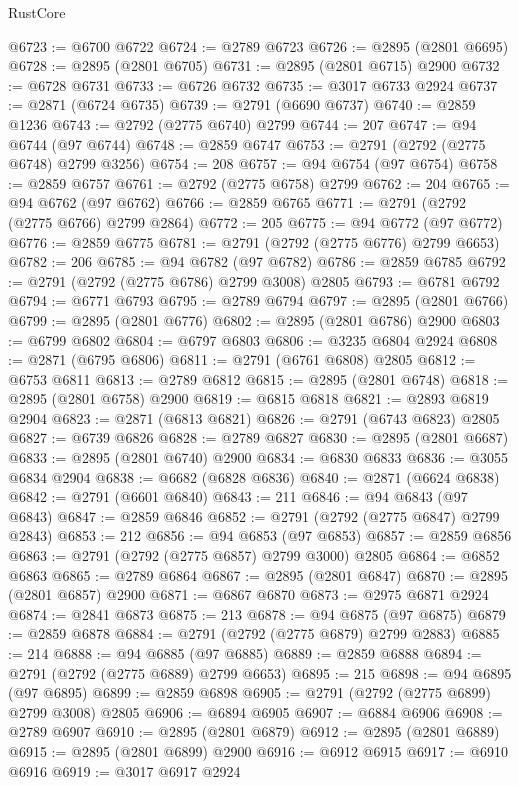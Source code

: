 \begin{lexlean}{RustCore}
\begin{coremodule}
@6723 := @6700 @6722
@6724 := @2789 @6723
@6726 := @2895 (@2801 @6695)
@6728 := @2895 (@2801 @6705)
@6731 := @2895 (@2801 @6715) @2900
@6732 := @6728 @6731
@6733 := @6726 @6732
@6735 := @3017 @6733 @2924
@6737 := @2871 (@6724 @6735)
@6739 := @2791 (@6690 @6737)
@6740 := @2859 @1236
@6743 := @2792 (@2775 @6740) @2799
@6744 := 207
@6747 := @94 @6744 (@97 @6744)
@6748 := @2859 @6747
@6753 := @2791 (@2792 (@2775 @6748) @2799 @3256)
@6754 := 208
@6757 := @94 @6754 (@97 @6754)
@6758 := @2859 @6757
@6761 := @2792 (@2775 @6758) @2799
@6762 := 204
@6765 := @94 @6762 (@97 @6762)
@6766 := @2859 @6765
@6771 := @2791 (@2792 (@2775 @6766) @2799 @2864)
@6772 := 205
@6775 := @94 @6772 (@97 @6772)
@6776 := @2859 @6775
@6781 := @2791 (@2792 (@2775 @6776) @2799 @6653)
@6782 := 206
@6785 := @94 @6782 (@97 @6782)
@6786 := @2859 @6785
@6792 := @2791 (@2792 (@2775 @6786) @2799 @3008) @2805
@6793 := @6781 @6792
@6794 := @6771 @6793
@6795 := @2789 @6794
@6797 := @2895 (@2801 @6766)
@6799 := @2895 (@2801 @6776)
@6802 := @2895 (@2801 @6786) @2900
@6803 := @6799 @6802
@6804 := @6797 @6803
@6806 := @3235 @6804 @2924
@6808 := @2871 (@6795 @6806)
@6811 := @2791 (@6761 @6808) @2805
@6812 := @6753 @6811
@6813 := @2789 @6812
@6815 := @2895 (@2801 @6748)
@6818 := @2895 (@2801 @6758) @2900
@6819 := @6815 @6818
@6821 := @2893 @6819 @2904
@6823 := @2871 (@6813 @6821)
@6826 := @2791 (@6743 @6823) @2805
@6827 := @6739 @6826
@6828 := @2789 @6827
@6830 := @2895 (@2801 @6687)
@6833 := @2895 (@2801 @6740) @2900
@6834 := @6830 @6833
@6836 := @3055 @6834 @2904
@6838 := @6682 (@6828 @6836)
@6840 := @2871 (@6624 @6838)
@6842 := @2791 (@6601 @6840)
@6843 := 211
@6846 := @94 @6843 (@97 @6843)
@6847 := @2859 @6846
@6852 := @2791 (@2792 (@2775 @6847) @2799 @2843)
@6853 := 212
@6856 := @94 @6853 (@97 @6853)
@6857 := @2859 @6856
@6863 := @2791 (@2792 (@2775 @6857) @2799 @3000) @2805
@6864 := @6852 @6863
@6865 := @2789 @6864
@6867 := @2895 (@2801 @6847)
@6870 := @2895 (@2801 @6857) @2900
@6871 := @6867 @6870
@6873 := @2975 @6871 @2924
@6874 := @2841 @6873
@6875 := 213
@6878 := @94 @6875 (@97 @6875)
@6879 := @2859 @6878
@6884 := @2791 (@2792 (@2775 @6879) @2799 @2883)
@6885 := 214
@6888 := @94 @6885 (@97 @6885)
@6889 := @2859 @6888
@6894 := @2791 (@2792 (@2775 @6889) @2799 @6653)
@6895 := 215
@6898 := @94 @6895 (@97 @6895)
@6899 := @2859 @6898
@6905 := @2791 (@2792 (@2775 @6899) @2799 @3008) @2805
@6906 := @6894 @6905
@6907 := @6884 @6906
@6908 := @2789 @6907
@6910 := @2895 (@2801 @6879)
@6912 := @2895 (@2801 @6889)
@6915 := @2895 (@2801 @6899) @2900
@6916 := @6912 @6915
@6917 := @6910 @6916
@6919 := @3017 @6917 @2924

\end{coremodule}
\end{lexlean}
